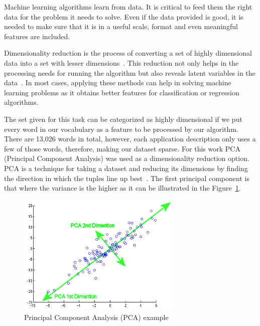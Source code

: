 \documentclass[letterpaper,10pt]{article}
\theoremstyle{mytheor}
\begin{document}
Machine learning algorithms learn from data. It is critical to feed them the right data for the problem it needs to solve. Even if the data provided is good, it is needed to make sure that it is in a useful scale, format and even meaningful features are included.

Dimensionality reduction is the process of converting a set of highly dimensional data into a set with lesser dimensions~\cite{russell1995modern}. This reduction not only helps in the processing needs for running the algorithm but also reveals latent variables in the data~\cite{bishop2007pattern}. In most cases, applying these methods can help in solving machine learning problems as it obtains better features for classification or regression algorithms.

The set given for this task can be categorized as highly dimensional if we put every word in our vocabulary as a feature to be processed by our algorithm. There are 13,026 words in total, however, each application description only uses a few of those words, therefore, making our dataset sparse. For this work PCA (Principal Component Analysis) was used as a dimensionality reduction option. PCA is a technique for taking a dataset and reducing its dimensions by finding the direction in which the tuples line up best~\cite{rajaraman2012mining}. The first principal component is that where the variance is the higher as it can be illustrated in the Figure~\ref{fig:3}.

\begin{figure}[H]
\includegraphics[width=0.7\textwidth]{pca}
\centering
\caption{Principal Component Analysis (PCA) example}
\label{fig:3}
\end{figure}

\end{document}

